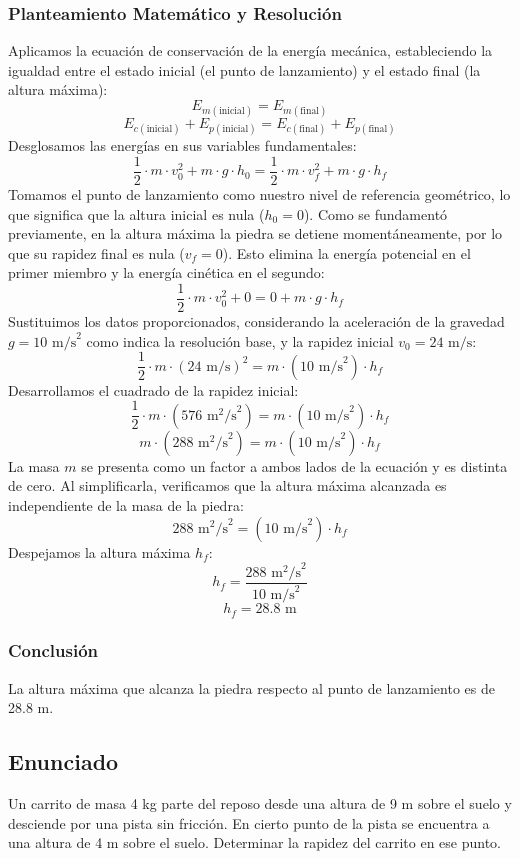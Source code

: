 \documentclass[12pt,a4paper]{article}
\begin{document}
\subsubsection*{Planteamiento Matemático y Resolución}
Aplicamos la ecuación de conservación de la energía mecánica, estableciendo la igualdad entre el estado inicial (el punto de lanzamiento) y el estado final (la altura máxima):
$$E_{m(\text{inicial})} = E_{m(\text{final})}$$
$$E_{c(\text{inicial})} + E_{p(\text{inicial})} = E_{c(\text{final})} + E_{p(\text{final})}$$
Desglosamos las energías en sus variables fundamentales:
$$\frac{1}{2} \cdot m \cdot v_0^2 + m \cdot g \cdot h_0 = \frac{1}{2} \cdot m \cdot v_f^2 + m \cdot g \cdot h_f$$
Tomamos el punto de lanzamiento como nuestro nivel de referencia geométrico, lo que significa que la altura inicial es nula ($h_0 = 0$). Como se fundamentó previamente, en la altura máxima la piedra se detiene momentáneamente, por lo que su rapidez final es nula ($v_f = 0$). Esto elimina la energía potencial en el primer miembro y la energía cinética en el segundo:
$$\frac{1}{2} \cdot m \cdot v_0^2 + 0 = 0 + m \cdot g \cdot h_f$$
Sustituimos los datos proporcionados, considerando la aceleración de la gravedad $g = 10 \text{ m/s}^2$ como indica la resolución base, y la rapidez inicial $v_0 = 24 \text{ m/s}$:
$$\frac{1}{2} \cdot m \cdot (24 \text{ m/s})^2 = m \cdot (10 \text{ m/s}^2) \cdot h_f$$
Desarrollamos el cuadrado de la rapidez inicial:
$$\frac{1}{2} \cdot m \cdot (576 \text{ m}^2\text{/s}^2) = m \cdot (10 \text{ m/s}^2) \cdot h_f$$
$$m \cdot (288 \text{ m}^2\text{/s}^2) = m \cdot (10 \text{ m/s}^2) \cdot h_f$$
La masa $m$ se presenta como un factor a ambos lados de la ecuación y es distinta de cero. Al simplificarla, verificamos que la altura máxima alcanzada es independiente de la masa de la piedra:
$$288 \text{ m}^2\text{/s}^2 = (10 \text{ m/s}^2) \cdot h_f$$
Despejamos la altura máxima $h_f$:
$$h_f = \frac{288 \text{ m}^2\text{/s}^2}{10 \text{ m/s}^2}$$
$$h_f = 28.8 \text{ m}$$

\subsubsection*{Conclusión}
La altura máxima que alcanza la piedra respecto al punto de lanzamiento es de 28.8 m.

\newpage

\subsection*{Enunciado}
Un carrito de masa 4 kg parte del reposo desde una altura de 9 m sobre el suelo y desciende por una pista sin fricción. En cierto punto de la pista se encuentra a una altura de 4 m sobre el suelo. Determinar la rapidez del carrito en ese punto.
\end{document}
